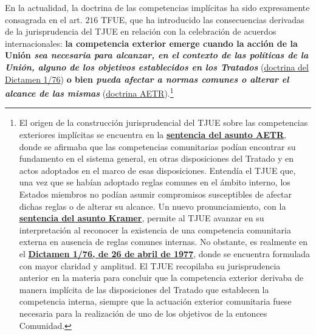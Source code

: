 \documentclass[10pt,a4paper]{article}
\begin{document}
En la actualidad, la doctrina de las competencias implícitas ha sido expresamente consagrada en el art. $216$ TFUE, que ha introducido las consecuencias derivadas de la jurisprudencia del TJUE en relación con la celebración de acuerdos internacionales: \textbf{la competencia exterior emerge cuando la acción de la Unión \textit{sea necesaria para alcanzar, en el contexto de las políticas de la Unión, alguno de los objetivos establecidos en los Tratados}} (\href{https://eur-lex.europa.eu/legal-content/ES/ALL/?uri=CELEX:61976CV0001}{doctrina del Dictamen 1/76}) \textbf{o bien \textit{pueda afectar a normas comunes o alterar el alcance de las mismas}} (\href{https://eur-lex.europa.eu/legal-content/ES/TXT/PDF/?uri=CELEX:61970CJ0022}{doctrina AETR}).\footnote{%
    El origen de la construcción jurisprudencial del TJUE sobre las competencias exteriores implícitas se encuentra en la \href{https://eur-lex.europa.eu/legal-content/ES/TXT/PDF/?uri=CELEX:61970CJ0022}{\textbf{sentencia del asunto AETR}}, donde se afirmaba que las competencias comunitarias podían encontrar su fundamento en el sistema general, en otras disposiciones del Tratado y en actos adoptados en el marco de esas disposiciones. Entendía el TJUE que, una vez que se habían adoptado reglas comunes en el ámbito interno, los Estados miembros no podían asumir compromisos susceptibles de afectar dichas reglas o de alterar su alcance. Un nuevo pronunciamiento, con la \href{https://eur-lex.europa.eu/legal-content/ES/TXT/PDF/?uri=CELEX:61976CJ0003}{\textbf{sentencia del asunto Kramer}}, permite al TJUE avanzar en su interpretación al reconocer la existencia de una competencia comunitaria externa en ausencia de reglas comunes internas. No obstante, es realmente en el \href{https://eur-lex.europa.eu/legal-content/ES/ALL/?uri=CELEX:61976CV0001}{\textbf{Dictamen 1/76, de 26 de abril de 1977}}, donde se encuentra formulada con mayor claridad y amplitud. El TJUE recopilaba su jurisprudencia anterior en la materia para concluir que la competencia exterior derivaba de manera implícita de las disposiciones del Tratado que establecen la competencia interna, siempre que la actuación exterior comunitaria fuese necesaria para la realización de uno de los objetivos de la entonces Comunidad.
}
\end{document}
